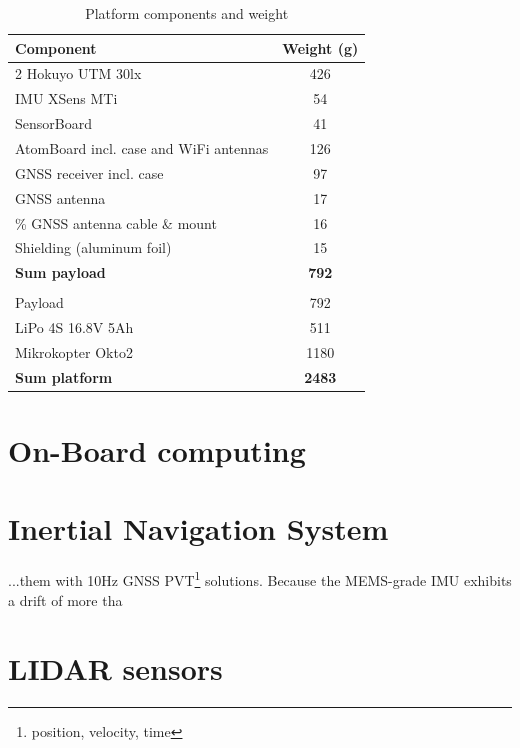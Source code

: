 \begin{table}[t]
\caption{Platform components and weight}
\label{table_platform_weight}
\begin{center}
\begin{tabular}{l|c}
  \textbf{Component} & \textbf{Weight (g)} \\
  \hline
  2 Hokuyo UTM 30lx & 426 \\
  IMU XSens MTi & 54 \\
  SensorBoard  & 41 \\
  AtomBoard incl. case and WiFi antennas & 126 \\
  GNSS receiver incl. case & 97 \\
  GNSS antenna & 17 \\
\% GNSS antenna cable \& mount & 16 \\
  Shielding (aluminum foil) & 15 \\ \hline
  \textbf{Sum payload} & \textbf{792} \\
  \\

  Payload & 792 \\
  LiPo 4S 16.8V 5Ah & 511 \\
  Mikrokopter Okto2 & 1180 \\ \hline
  \textbf{Sum platform} & \textbf{2483} \\
\end{tabular}
\end{center}
\end{table}

\section{On-Board computing}
\label{section_experimental_platform_hardware_computers}

\section{Inertial Navigation System}
\label{section_experimental_platform_hardware_ins}

...them with 10Hz GNSS PVT\footnote{position, velocity, time} solutions. Because the MEMS-grade IMU exhibits a drift of more tha

\section{LIDAR sensors}
\label{section_experimental_platform_hardware_lidar}



